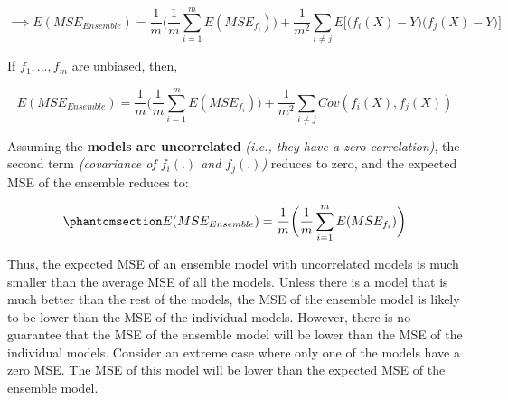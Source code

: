 \documentclass[
  letterpaper,
  DIV=11,
  numbers=noendperiod]{scrreprt}
\begin{document}
\[ \implies E(MSE_{Ensemble}) = \frac{1}{m}\bigg(\frac{1}{m} \sum_{i=1}^m E(MSE_{f_i})\bigg) + \frac{1}{m^2} \sum_{i \ne j} E\bigg[\big(f_i(X) - Y\big)\big(f_j(X) - Y\big) \bigg]\]

If \(f_1, ..., f_m\) are unbiased, then,

\[ E(MSE_{Ensemble}) = \frac{1}{m}\bigg(\frac{1}{m} \sum_{i=1}^m E(MSE_{f_i})\bigg) + \frac{1}{m^2} \sum_{i \ne j} Cov(f_i(X), f_j(X))\]

Assuming the \textbf{models are uncorrelated} \emph{(i.e., they have a
zero correlation)}, the second term \emph{(covariance of \(f_i(.)\) and
\(f_j(.)\))} reduces to zero, and the expected MSE of the ensemble
reduces to:

\begin{equation}\phantomsection\label{eq-ensemble}{
E(MSE_{Ensemble}) = \frac{1}{m}\bigg(\frac{1}{m} \sum_{i=1}^m E(MSE_{f_i})\bigg)
}\end{equation}

Thus, the expected MSE of an ensemble model with uncorrelated models is
much smaller than the average MSE of all the models. Unless there is a
model that is much better than the rest of the models, the MSE of the
ensemble model is likely to be lower than the MSE of the individual
models. However, there is no guarantee that the MSE of the ensemble
model will be lower than the MSE of the individual models. Consider an
extreme case where only one of the models have a zero MSE. The MSE of
this model will be lower than the expected MSE of the ensemble model.
\end{document}
